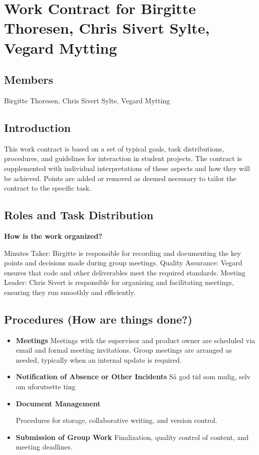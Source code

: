 \chapter{Work Contract for Birgitte Thoresen, Chris Sivert Sylte, Vegard Mytting}

\section*{Members}
Birgitte Thoresen, Chris Sivert Sylte, Vegard Mytting

\section*{Introduction}
This work contract is based on a set of typical goals, task distributions, procedures, and guidelines for interaction in student projects. The contract is supplemented with individual interpretations of these aspects and how they will be achieved.  
Points are added or removed as deemed necessary to tailor the contract to the specific task.  

\section*{Roles and Task Distribution}
\textbf{How is the work organized?}  

Minutes Taker: Birgitte is responsible for recording and documenting the key points and decisions made during group meetings.
Quality Assurance: Vegard ensures that code and other deliverables meet the required standards.
Meeting Leader: Chris Sivert is responsible for organizing and facilitating meetings, ensuring they run smoothly and efficiently.

\section*{Procedures (How are things done?)}
\begin{itemize}
    \setlength{\itemsep}{10pt} %
    \item \textbf{Meetings}  
    Meetings with the supervisor and product owner are scheduled via email and formal meeting invitations. Group meetings are arranged as needed, typically when an internal update is required.

    \item \textbf{Notification of Absence or Other Incidents}  
    Så god tid som mulig, selv om uforutsette ting 

    \item \textbf{Document Management}  
    
    Procedures for storage, collaborative writing, and version control.

    \item \textbf{Submission of Group Work}  
    Finalization, quality control of content, and meeting deadlines.
\end{itemize}

